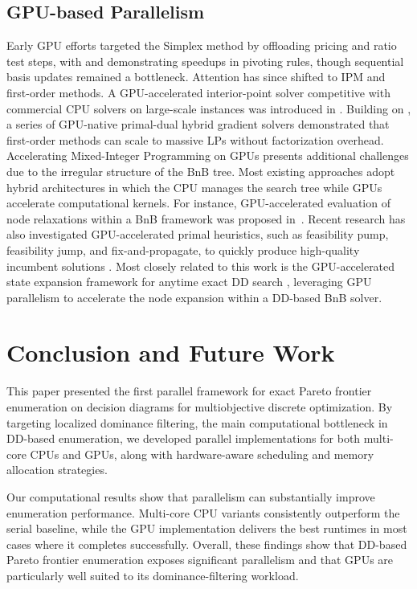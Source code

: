\documentclass[letterpaper]{article}
\begin{document}
\subsection{GPU-based Parallelism}
Early GPU efforts targeted the Simplex method by offloading pricing and ratio test steps, with \cite{lalami2011gpu} and \cite{ploskas2016gpu} demonstrating speedups in pivoting rules, though sequential basis updates remained a bottleneck. Attention has since shifted to IPM and first-order methods. A GPU-accelerated interior-point solver competitive with commercial CPU solvers on large-scale instances was introduced in \cite{shin2025madipm}. Building on \cite{applegate2021practical}, a series of GPU-native primal-dual hybrid gradient solvers \cite{lu2025cupdlp,lu2023cupdlpc,lu2025cupdlpx} demonstrated that first-order methods can scale to massive LPs without factorization overhead. Accelerating Mixed-Integer Programming on GPUs presents additional challenges due to the irregular structure of the BnB tree. Most existing approaches adopt hybrid architectures in which the CPU manages the search tree while GPUs accelerate computational kernels. For instance, GPU-accelerated evaluation of node relaxations within a BnB framework was proposed in~\cite{boyer2017gpu}. Recent research has also investigated GPU-accelerated primal heuristics, such as feasibility pump, feasibility jump, and fix-and-propagate, to quickly produce high-quality incumbent solutions \cite{ccorduk2025gpu}. Most closely related to this work is the GPU-accelerated state expansion framework for anytime exact DD search \cite{tardivo2026gpu}, leveraging GPU parallelism to accelerate the node expansion within a DD-based BnB solver.

\section{Conclusion and Future Work}
\label{sec:conclusion}

This paper presented the first parallel framework for exact Pareto frontier enumeration on decision diagrams for multiobjective discrete optimization. By targeting localized dominance filtering, the main computational bottleneck in DD-based enumeration, we developed parallel implementations for both multi-core CPUs and GPUs, along with hardware-aware scheduling and memory allocation strategies.

Our computational results show that parallelism can substantially improve enumeration performance. Multi-core CPU variants consistently outperform the serial baseline, while the GPU implementation delivers the best runtimes in most cases where it completes successfully. Overall, these findings show that DD-based Pareto frontier enumeration exposes significant parallelism and that GPUs are particularly well suited to its dominance-filtering workload.
\end{document}
